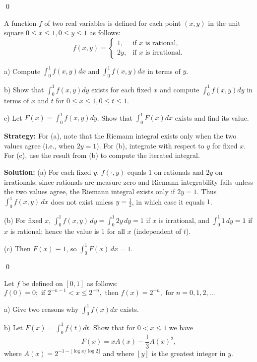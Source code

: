 \qed
\begin{problembox}
A function $f$ of two real variables is defined for each point $(x, y)$ in the unit square $0 \leq x \leq 1, 0 \leq y \leq 1$ as follows:
\[f(x, y) = 
\begin{cases}
1, & \text{if } x \text{ is rational}, \\
2y, & \text{if } x \text{ is irrational}.
\end{cases}\]

a) Compute $\int_{0}^{1} f(x, y) dx$ and $\int_{0}^{1} f(x, y) dx$ in terms of $y$.

b) Show that $\int_{0}^{1} f(x, y) dy$ exists for each fixed $x$ and compute $\int_{0}^{1} f(x, y) dy$ in terms of $x$ and $t$ for $0 \leq x \leq 1, 0 \leq t \leq 1$.

c) Let $F(x) = \int_{0}^{1} f(x, y) dy$. Show that $\int_{0}^{1} F(x) dx$ exists and find its value.
\end{problembox}

\noindent\textbf{Strategy:} For (a), note that the Riemann integral exists only when the two values agree (i.e., when $2y = 1$). For (b), integrate with respect to $y$ for fixed $x$. For (c), use the result from (b) to compute the iterated integral.

\bigskip\noindent\textbf{Solution:}
(a) For each fixed $y$, $f(\cdot,y)$ equals $1$ on rationals and $2y$ on irrationals; since rationals are measure zero and Riemann integrability fails unless the two values agree, the Riemann integral exists only if $2y=1$. Thus $\int_0^1 f(x,y)\,dx$ does not exist unless $y=\tfrac12$, in which case it equals $1$.

(b) For fixed $x$, $\int_0^1 f(x,y)\,dy=\int_0^1 2y\,dy=1$ if $x$ is irrational, and $\int_0^1 1\,dy=1$ if $x$ is rational; hence the value is $1$ for all $x$ (independent of $t$).

(c) Then $F(x)\equiv 1$, so $\int_0^1 F(x)\,dx=1$.




\qed
\begin{problembox}
Let $f$ be defined on $[0, 1]$ as follows: $f(0) = 0; \text{ if } 2^{-n-1} < x \leq 2^{-n}, \text{ then } f(x) = 2^{-n}, \text{ for } n = 0, 1, 2, \ldots$

a) Give two reasons why $\int_{0}^{1} f(x) dx$ exists.

b) Let $F(x) = \int_{0}^{1} f(t) dt$. Show that for $0 < x \leq 1$ we have
\[F(x) = xA(x) - \frac{1}{3} A(x)^{2},\]
where $A(x) = 2^{-1-\lfloor \log x / \log 2 \rfloor}$ and where $[y]$ is the greatest integer in $y$.
\end{problembox}

